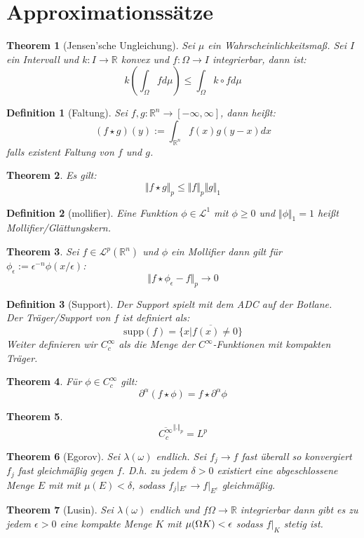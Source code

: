 \documentclass[10pt,a4paper]{article}
\newtheorem{theorem}{Theorem}
\newtheorem{definition}{Definition}
\begin{document}
\section{Approximationssätze}
\begin{theorem}[Jensen'sche Ungleichung]
	Sei $\mu$ ein Wahrscheinlichkeitsmaß. Sei $I$ ein Intervall und $k: I \to \mathbb{R}$ konvex und $f: \Omega \to I$ integrierbar, dann ist: 
	$$k(\int_\Omega f d\mu) \leq \int_\Omega k\circ f d\mu$$
\end{theorem}
\begin{definition}[Faltung]
	Sei $f,g: \mathbb{R}^n \to [-\infty, \infty]$, dann heißt:
	$$(f\star g )(y) := \int_{\mathbb{R}^n}f(x)g(y-x)dx$$
	falls existent Faltung von $f$ und $g$.
\end{definition}
\begin{theorem}
	Es gilt:
	$$\Vert f\star g\Vert_p \leq \Vert f\Vert_p\Vert g\Vert_1$$
\end{theorem}
\begin{definition}[mollifier]
	Eine Funktion $\phi\in\mathcal{L}^1 $ mit $\phi\geq 0$ und $\Vert \phi \Vert_1 = 1$ heißt Mollifier/Glättungskern.
\end{definition}
\begin{theorem}
	Sei $f\in \mathcal{L}^p(\mathbb{R}^n)$ und $\phi$ ein Mollifier dann gilt für $\phi_\epsilon:= \epsilon^{-n}\phi(x/\epsilon)$:
	$$\Vert f\star \phi_\epsilon -f\Vert_p \to 0$$
\end{theorem}
\begin{definition}[Support]
	Der Support spielt mit dem ADC auf der Botlane. \\
	Der Träger/Support von $f$ ist definiert als:
	$$\text{supp}(f) = \overline{\{x | f(x) \neq 0\}}$$
	Weiter definieren wir $C^\infty_c$ als die Menge der $C^\infty$-Funktionen mit kompakten Träger.
\end{definition}
\begin{theorem}
	Für $\phi \in C_c^\infty$ gilt:
	$$\partial^\alpha(f\star \phi) = f\star \partial^\alpha\phi$$
\end{theorem}
\begin{theorem}
	$$\overline{C_c^\infty}^{\Vert . \Vert_p} = L^p$$
\end{theorem}
\begin{theorem}[Egorov]
	Sei $\lambda(\omega)$ endlich. Sei $f_j \to f$ fast überall so konvergiert $f_j$ fast gleichmäßig gegen $f$. D.h. zu jedem $\delta > 0$ existiert eine abgeschlossene Menge $E$ mit mit $\mu(E) < \delta$, sodass $f_j|_{E^c} \to f|_{E^c}$ gleichmäßig.
\end{theorem}
\begin{theorem}[Lusin]
	Sei $\lambda(\omega)$ endlich und $f \Omega \to \mathbb{R}$ integrierbar dann gibt es zu jedem $\epsilon > 0$ eine kompakte Menge $K$ mit $\mu(\Omega\\K) < \epsilon$ sodass $f|_K$ stetig ist.  
\end{theorem}
\end{document}
